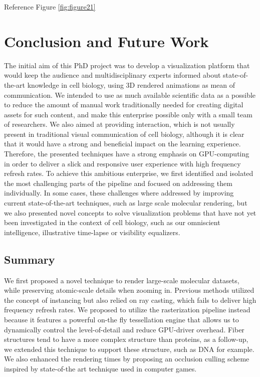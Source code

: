 Reference Figure \ref{fig:figure21}

\section{Conclusion and Future Work}
\label{sec:section5}

The initial aim of this PhD project was to develop a visualization platform that would keep the audience and multidisciplinary experts informed about state-of-the-art knowledge in cell biology, using 3D rendered animations as mean of communication.
We intended to use as much available scientific data as a possible to reduce the amount of manual work traditionally needed for creating digital assets for such content, and make this enterprise possible only with a small team of researchers.
We also aimed at providing interaction, which is not usually present in traditional visual communication of cell biology, although it is clear that it would have a strong and beneficial impact on the learning experience.
Therefore, the presented techniques have a strong emphasis on GPU-computing in order to deliver a slick and responsive user experience with high frequency refresh rates. 
To achieve this ambitious enterprise, we first identified and isolated the most challenging parts of the pipeline and focused on addressing them individually.
In some cases, these challenges where addressed by improving current state-of-the-art techniques, such as large scale molecular rendering, but we also presented novel concepts to solve visualization problems that have not yet been investigated in the context of cell biology, such as our omniscient intelligence, illustrative time-lapse or visibility equalizers.  

\subsection{Summary}

We first proposed a novel technique to render large-scale molecular datasets, while preserving atomic-scale details when zooming in.
Previous methods utilized the concept of instancing but also relied on ray casting, which fails to deliver high frequency refresh rates. 
We proposed to utilize the rasterization pipeline instead because it features a powerful on-the fly tessellation engine that allows us to dynamically control the level-of-detail and reduce GPU-driver overhead. 
Fiber structures tend to have a more complex structure than proteins, as a follow-up, we extended this technique to support these structure, such as DNA for example.
We also enhanced the rendering times by proposing an occlusion culling scheme inspired by state-of-the art technique used in computer games. 

